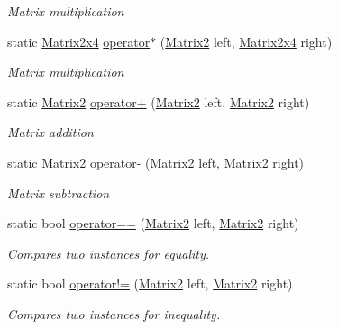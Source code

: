 \begin{DoxyCompactItemize}
\begin{DoxyCompactList}\small\item\em Matrix multiplication \end{DoxyCompactList}\item 
static \hyperlink{struct_open_t_k_1_1_matrix2x4}{Matrix2x4} \hyperlink{struct_open_t_k_1_1_matrix2_a4c60fcd9da604ade925aa1294d547553}{operator$\ast$} (\hyperlink{struct_open_t_k_1_1_matrix2}{Matrix2} left, \hyperlink{struct_open_t_k_1_1_matrix2x4}{Matrix2x4} right)
\begin{DoxyCompactList}\small\item\em Matrix multiplication \end{DoxyCompactList}\item 
static \hyperlink{struct_open_t_k_1_1_matrix2}{Matrix2} \hyperlink{struct_open_t_k_1_1_matrix2_ad3b62e6bc4154be0bdf957706a68999c}{operator+} (\hyperlink{struct_open_t_k_1_1_matrix2}{Matrix2} left, \hyperlink{struct_open_t_k_1_1_matrix2}{Matrix2} right)
\begin{DoxyCompactList}\small\item\em Matrix addition \end{DoxyCompactList}\item 
static \hyperlink{struct_open_t_k_1_1_matrix2}{Matrix2} \hyperlink{struct_open_t_k_1_1_matrix2_a70779c87fbdf8959145b2d8e812f0591}{operator-\/} (\hyperlink{struct_open_t_k_1_1_matrix2}{Matrix2} left, \hyperlink{struct_open_t_k_1_1_matrix2}{Matrix2} right)
\begin{DoxyCompactList}\small\item\em Matrix subtraction \end{DoxyCompactList}\item 
static bool \hyperlink{struct_open_t_k_1_1_matrix2_a34a08ee52d805d7d33ab251fa4ffe295}{operator==} (\hyperlink{struct_open_t_k_1_1_matrix2}{Matrix2} left, \hyperlink{struct_open_t_k_1_1_matrix2}{Matrix2} right)
\begin{DoxyCompactList}\small\item\em Compares two instances for equality. \end{DoxyCompactList}\item 
static bool \hyperlink{struct_open_t_k_1_1_matrix2_afb8c62aa855cbd8a9525dafe658bb6e3}{operator!=} (\hyperlink{struct_open_t_k_1_1_matrix2}{Matrix2} left, \hyperlink{struct_open_t_k_1_1_matrix2}{Matrix2} right)
\begin{DoxyCompactList}\small\item\em Compares two instances for inequality. \end{DoxyCompactList}\end{DoxyCompactItemize}
